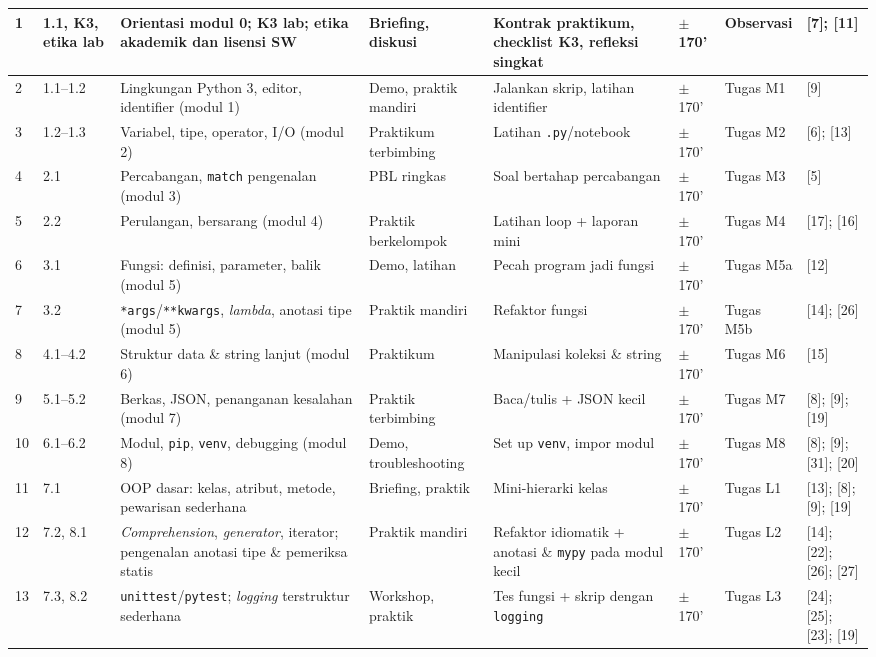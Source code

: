 \documentclass[12pt,a4paper]{article}
\begin{document}
{\begin{landscape}
\begin{longtable}{|p{0.55cm}|p{2.35cm}|p{2.5cm}|p{1.65cm}|p{2.55cm}|p{1.05cm}|p{1.75cm}|p{3.15cm}|}
1 & 1.1, K3, etika lab & Orientasi modul 0; K3 lab; etika akademik dan lisensi SW & Briefing, diskusi & Kontrak praktikum, checklist K3, refleksi singkat & $\pm$170' & Observasi & [7]; [11] \\
\hline
2 & 1.1--1.2 & Lingkungan Python 3, editor, identifier (modul 1) & Demo, praktik mandiri & Jalankan skrip, latihan identifier & $\pm$170' & Tugas M1 & [9] \\
\hline
3 & 1.2--1.3 & Variabel, tipe, operator, I/O (modul 2) & Praktikum terbimbing & Latihan \texttt{.py}/notebook & $\pm$170' & Tugas M2 & [6]; [13] \\
\hline
4 & 2.1 & Percabangan, \texttt{match} pengenalan (modul 3) & PBL ringkas & Soal bertahap percabangan & $\pm$170' & Tugas M3 & [5] \\
\hline
5 & 2.2 & Perulangan, bersarang (modul 4) & Praktik berkelompok & Latihan loop + laporan mini & $\pm$170' & Tugas M4 & [17]; [16] \\
\hline
6 & 3.1 & Fungsi: definisi, parameter, balik (modul 5) & Demo, latihan & Pecah program jadi fungsi & $\pm$170' & Tugas M5a & [12] \\
\hline
7 & 3.2 & \texttt{*args}/\texttt{**kwargs}, \textit{lambda}, anotasi tipe (modul 5) & Praktik mandiri & Refaktor fungsi & $\pm$170' & Tugas M5b & [14]; [26] \\
\hline
8 & 4.1--4.2 & Struktur data \& string lanjut (modul 6) & Praktikum & Manipulasi koleksi \& string & $\pm$170' & Tugas M6 & [15] \\
\hline
9 & 5.1--5.2 & Berkas, JSON, penanganan kesalahan (modul 7) & Praktik terbimbing & Baca/tulis + JSON kecil & $\pm$170' & Tugas M7 & [8]; [9]; [19] \\
\hline
10 & 6.1--6.2 & Modul, \texttt{pip}, \texttt{venv}, debugging (modul 8) & Demo, troubleshooting & Set up \texttt{venv}, impor modul & $\pm$170' & Tugas M8 & [8]; [9]; [31]; [20] \\
\hline
11 & 7.1 & OOP dasar: kelas, atribut, metode, pewarisan sederhana & Briefing, praktik & Mini-hierarki kelas & $\pm$170' & Tugas L1 & [13]; [8]; [9]; [19] \\
\hline
12 & 7.2, 8.1 & \textit{Comprehension}, \textit{generator}, iterator; pengenalan anotasi tipe \& pemeriksa statis & Praktik mandiri & Refaktor idiomatik + anotasi \& \texttt{mypy} pada modul kecil & $\pm$170' & Tugas L2 & [14]; [22]; [26]; [27] \\
\hline
13 & 7.3, 8.2 & \texttt{unittest}/\texttt{pytest}; \textit{logging} terstruktur sederhana & Workshop, praktik & Tes fungsi + skrip dengan \texttt{logging} & $\pm$170' & Tugas L3 & [24]; [25]; [23]; [19] \\

\end{longtable}
\end{landscape}}
\end{document}
